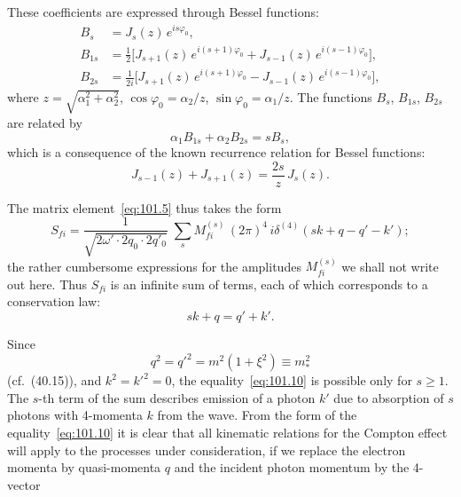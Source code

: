These coefficients are expressed through Bessel functions:
\begin{equation}
\begin{aligned}
B_s &= J_s(z)\,e^{is\varphi_0}, \\
B_{1s} &= \tfrac{1}{2}\bigl[J_{s+1}(z)\,e^{i(s+1)\varphi_0} + J_{s-1}(z)\,e^{i(s-1)\varphi_0}\bigr], \\
B_{2s} &= \tfrac{1}{2i}\bigl[J_{s+1}(z)\,e^{i(s+1)\varphi_0} - J_{s-1}(z)\,e^{i(s-1)\varphi_0}\bigr],
\end{aligned}
\label{eq:101.7}
\end{equation}
where $z = \sqrt{\alpha_1^2 + \alpha_2^2}$, $\cos\varphi_0 = \alpha_2/z$, $\sin\varphi_0 = \alpha_1/z$. The functions $B_s$, $B_{1s}$, $B_{2s}$ are related by
\begin{equation}
\alpha_1 B_{1s} + \alpha_2 B_{2s} = s B_s,
\label{eq:101.8}
\end{equation}
which is a consequence of the known recurrence relation for Bessel functions:
\[
J_{s-1}(z) + J_{s+1}(z) = \frac{2s}{z}\,J_s(z).
\]

The matrix element~\eqref{eq:101.5} thus takes the form
\begin{equation}
S_{fi} = \frac{1}{\sqrt{2\omega'\cdot 2q_0\cdot 2q'_0}}\;\sum_s M_{fi}^{(s)}\,(2\pi)^4\,i\delta^{(4)}(sk + q - q' - k');
\label{eq:101.9}
\end{equation}
the rather cumbersome expressions for the amplitudes $M_{fi}^{(s)}$ we shall not write out here. Thus $S_{fi}$ is an infinite sum of terms, each of which corresponds to a conservation law:
\begin{equation}
sk + q = q' + k'.
\label{eq:101.10}
\end{equation}

Since
\begin{equation}
q^2 = q'^2 = m^2(1 + \xi^2) \equiv m_*^2
\label{eq:101.11}
\end{equation}
(cf.~(40.15)), and $k^2 = k'^2 = 0$, the equality~\eqref{eq:101.10} is possible only for $s \geq 1$. The $s$-th term of the sum describes emission of a photon $k'$ due to absorption of $s$ photons with 4-momenta $k$ from the wave. From the form of the equality~\eqref{eq:101.10} it is clear that all kinematic relations for the Compton effect will apply to the processes under consideration, if we replace the electron momenta by quasi-momenta $q$ and the incident photon momentum by the 4-vector


